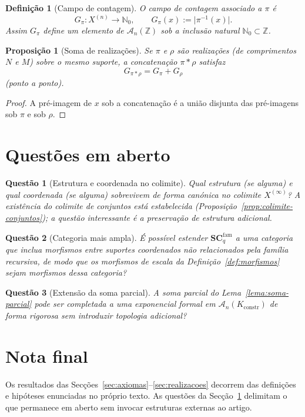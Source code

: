 \documentclass[11pt,a4paper]{article}
\newtheorem{definicao}{Definição}
\newtheorem{proposicao}{Proposição}
\newtheorem{questao}{Questão}
\begin{document}
\begin{definicao}[Campo de contagem]
\label{def:campo-contagem}
O campo de contagem associado a \(\pi\) é
\[
G_\pi\colon X^{(n)}\to\mathbb N_0,
\qquad
G_\pi(x) := \lvert\pi^{-1}(x)\rvert.
\]
Assim \(G_\pi\) define um elemento de \(\mathcal A_n(\mathbb Z)\) sob a
inclusão natural \(\mathbb N_0\subset\mathbb Z\).
\end{definicao}

\begin{proposicao}[Soma de realizações]
\label{prop:soma-realizacoes}
Se \(\pi\) e \(\rho\) são realizações (de comprimentos \(N\) e \(M\)) sobre
o mesmo suporte, a concatenação \(\pi\ast\rho\) satisfaz
\[
G_{\pi\ast\rho} = G_\pi + G_\rho
\]
(ponto a ponto).
\end{proposicao}

\begin{proof}
A pré-imagem de \(x\) sob a concatenação é a união disjunta das pré-imagens
sob \(\pi\) e sob \(\rho\).
\end{proof}

\section{Questões em aberto}
\label{sec:abertas}

\begin{questao}[Estrutura e coordenada no colimite]
\label{questao:colimite}
Qual estrutura (se alguma) e qual coordenada (se alguma) sobrevivem de forma
canónica no colimite \(X^{(\infty)}\)?
A existência do colimite de conjuntos está estabelecida
(Proposição~\ref{prop:colimite-conjuntos}); a questão interessante é a
preservação de estrutura adicional.
\end{questao}

\begin{questao}[Categoria mais ampla]
\label{questao:categoria-ampla}
É possível estender \(\mathbf{SC}_q^{\mathrm{fam}}\) a uma categoria que
inclua morfismos entre suportes coordenados não relacionados pela família
recursiva, de modo que os morfismos de escala da
Definição~\ref{def:morfismos} sejam morfismos dessa categoria?
\end{questao}

\begin{questao}[Extensão da soma parcial]
\label{questao:analitica}
A soma parcial do Lema~\ref{lema:soma-parcial} pode ser completada a uma
exponencial formal em \(\mathcal A_n(K_{\mathrm{constr}})\) de forma
rigorosa sem introduzir topologia adicional?
\end{questao}

\section*{Nota final}

Os resultados das Secções~\ref{sec:axiomas}--\ref{sec:realizacoes}
decorrem das definições e hipóteses enunciadas no próprio texto.
As questões da Secção~\ref{sec:abertas} delimitam o que permanece em aberto
sem invocar estruturas externas ao artigo.
\end{document}
